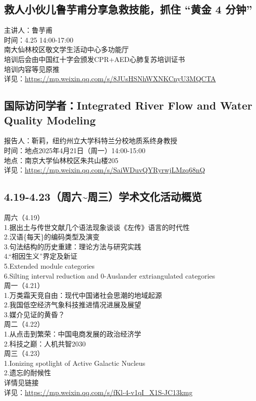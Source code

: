\documentclass[letterpaper, 12pt]{article}
\begin{document}
\begin{multicols}{2}
\subsection{救人小伙儿鲁芋甫分享急救技能，抓住 “黄金 4 分钟”}
主讲人：鲁芋甫
\\时间：4.25 14:00-17:00
\\南大仙林校区敬文学生活动中心多功能厅
\\培训后会由中国红十字会颁发CPR+AED心肺复苏培训证书
\\培训内容等见原推
\\详见：\url{https://mp.weixin.qq.com/s/8JUsHSNhWXNKCnyU3MQCTA}

\subsection{国际访问学者：Integrated River Flow and Water Quality Modeling}
报告人：靳莉，纽约州立大学科特兰分校地质系终身教授
\\时间：地点2025年4月21日（周一）14:00-15:00
\\地点：南京大学仙林校区朱共山楼205
\\详见：\url{https://mp.weixin.qq.com/s/SaiWDuvQYRyrwjLMzq68nQ}

\subsection{4.19-4.23（周六\textasciitilde{}周三）学术文化活动概览}
周六（4.19）
\\1.据出土与传世文献几个语法现象谈谈《左传》语言的时代性
\\2.汉语\{每天\}的编码类型及演变
\\3.句法结构的历史重建：理论方法与研究实践
\\4.“相因生义”界定及新证
\\5.Extended module categories
\\6.Silting interval reduction and 0-Auslander extriangulated categories
\\周一（4.21）
\\1.万类霜天竞自由：现代中国诸社会思潮的地域起源
\\2.我国低空经济气象科技推进情况进展及展望
\\3.媒介见证的黄昏？
\\周二（4.22）
\\1.从点击到繁荣：中国电商发展的政治经济学
\\2.科技之巅：人机共智2030
\\周三（4.23）
\\1.Ionizing spotlight of Active Galactic Nucleus
\\2.遗忘的耐候性
\\详情见链接
\\详见：\url{https://mp.weixin.qq.com/s/fKl-4-v1qI_X1S-JC13kmg}



\end{multicols}
\end{document}
